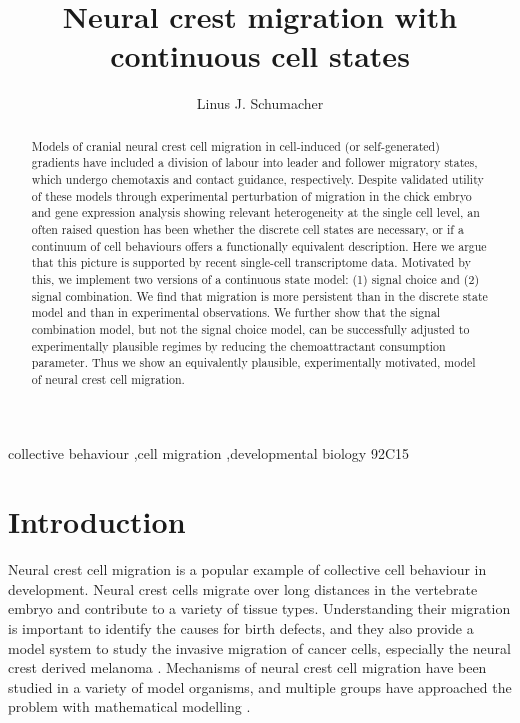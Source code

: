 \documentclass[review]{elsarticle}
\begin{document}
\begin{frontmatter}

\title{Neural crest migration with continuous cell states}

\author{Linus J. Schumacher}
\address{MCR Centre for Regenerative Medicine, University of Edinburgh}


\begin{abstract}
Models of cranial neural crest cell migration in cell-induced (or self-generated) gradients have included a division of labour into leader and follower migratory states, which undergo chemotaxis and contact guidance, respectively. Despite validated utility of these models through experimental perturbation of migration in the chick embryo and gene expression analysis showing relevant heterogeneity at the single cell level, an often raised question has been whether the discrete cell states are necessary, or if a continuum of cell behaviours offers a functionally equivalent description. Here we argue that this picture is supported by recent single-cell transcriptome data. Motivated by this, we implement two versions of a continuous state model: (1) signal choice and (2) signal combination. We find that migration is more persistent than in the discrete state model and than in experimental observations. We further show that the signal combination model, but not the signal choice model, can be successfully adjusted to experimentally plausible regimes by reducing the chemoattractant consumption parameter. Thus we show an equivalently plausible, experimentally motivated, model of neural crest cell migration.
\end{abstract}

\begin{keyword}
collective behaviour \sep cell migration \sep developmental biology
\MSC[2010] 92C15
\end{keyword}

\end{frontmatter}

\linenumbers

\section{Introduction}
Neural crest cell migration is a popular example of collective cell behaviour in development. Neural crest cells migrate over long distances in the vertebrate embryo and contribute to a variety of tissue types. Understanding their migration is important to identify the causes for birth defects, and they also provide a model system to study the invasive migration of cancer cells, especially the neural crest derived melanoma \cite{Kulesa2006,Bailey2012,McLennan2017}. Mechanisms of neural crest cell migration have been studied in a variety of model organisms, and multiple groups have approached the problem with mathematical modelling \cite{Simpson2007,Landman2011,Carmona-Fontaine2011,Wynn2012,Wynn2013,McLennan2012,McLennan2015,Mort2016,Zhang2018,Merchant2018}. %
\end{document}
